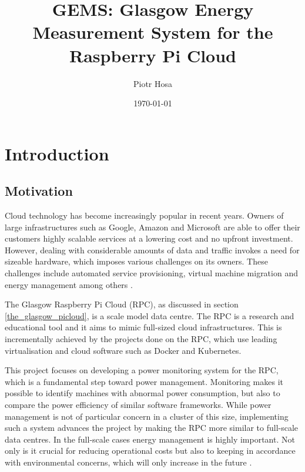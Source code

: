 \documentclass{l4proj}
\begin{document}
\title{GEMS: Glasgow Energy Measurement System for the Raspberry Pi Cloud}
\author{Piotr Hosa}
\date{\today}
\maketitle

\begin{abstract}

\end{abstract}

\renewcommand{\abstractname}{Acknowledgements}
\begin{abstract}

\end{abstract}

\educationalconsent
%
%
\tableofcontents

\chapter{Introduction}

\section{Motivation}
Cloud technology has become increasingly popular in recent years. Owners of large infrastructures such as Google, Amazon and Microsoft are able to offer their customers highly scalable services at a lowering cost and no upfront investment. However, dealing with considerable amounts of data and traffic invokes a need for sizeable hardware, which imposes various challenges on its owners. These challenges include automated service provisioning, virtual machine migration and energy management among others \cite{zhang_cheng_boutaba_2010}.

\noindent
The Glasgow Raspberry Pi Cloud (RPC), as discussed in section \ref{the_glasgow_picloud}, is a scale model data centre. The RPC is a research and educational tool and it aims to mimic full-sized cloud infrastructures. This is incrementally achieved by the projects done on the RPC, which use leading virtualisation and cloud software such as Docker and Kubernetes.

\noindent
This project focuses on developing a power monitoring system for the RPC, which is a fundamental step toward power management. Monitoring makes it possible to identify machines with abnormal power consumption, but also to compare the power efficiency of similar software frameworks. While power management is not of particular concern in a cluster of this size, implementing such a system advances the project by making the RPC more similar to full-scale data centres. In the full-scale cases energy management is highly important. Not only is it crucial for reducing operational costs but also to keeping in accordance with environmental concerns, which will only increase in the future \cite{dabbagh_hamdaoui_guizani_rayes_2015}.
\end{document}
